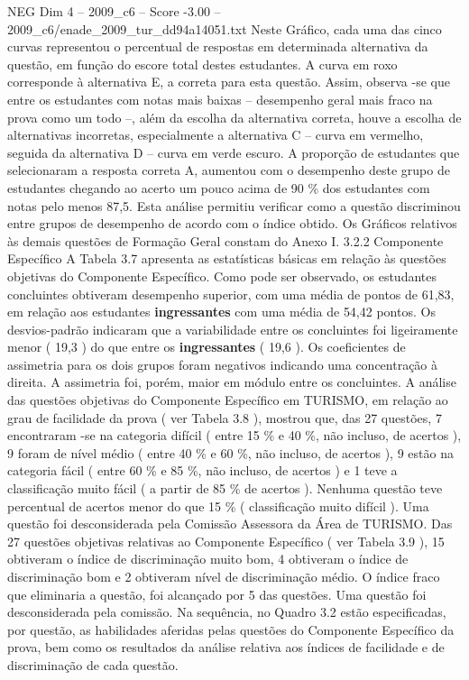 \begin{textsample}{NEG Dim 4 – 2009\_c6 – Score -3.00 – 2009\_c6/enade\_2009\_tur\_dd94a14051.txt}
Neste Gráfico, cada uma das cinco curvas representou o percentual de respostas em determinada alternativa da questão, em função do escore total destes estudantes.
A curva em roxo corresponde à alternativa E, a correta para esta questão.
Assim, observa -se que entre os estudantes com notas mais baixas – desempenho geral mais fraco na prova como um todo –, além da escolha da alternativa correta, houve a escolha de alternativas incorretas, especialmente a alternativa C – curva em vermelho, seguida da alternativa D – curva em verde escuro.
A proporção de estudantes que selecionaram a resposta correta A, aumentou com o desempenho deste grupo de estudantes chegando ao acerto um pouco acima de 90 \% dos estudantes com notas pelo menos 87,5.
Esta análise permitiu verificar como a questão discriminou entre grupos de desempenho de acordo com o índice obtido.
Os Gráficos relativos às demais questões de Formação Geral constam do Anexo I. 3.2.2 Componente Específico A Tabela 3.7 apresenta as estatísticas básicas em relação às questões objetivas do Componente Específico.
Como pode ser observado, os estudantes concluintes obtiveram desempenho superior, com uma média de pontos de 61,83, em relação aos estudantes \textbf{ingressantes} com uma média de 54,42 pontos.
Os desvios-padrão indicaram que a variabilidade entre os concluintes foi ligeiramente menor ( 19,3 ) do que entre os \textbf{ingressantes} ( 19,6 ).
Os coeficientes de assimetria para os dois grupos foram negativos indicando uma concentração à direita.
A assimetria foi, porém, maior em módulo entre os concluintes.
A análise das questões objetivas do Componente Específico em TURISMO, em relação ao grau de facilidade da prova ( ver Tabela 3.8 ), mostrou que, das 27 questões, 7 encontraram -se na categoria difícil ( entre 15 \% e 40 \%, não incluso, de acertos ), 9 foram de nível médio ( entre 40 \% e 60 \%, não incluso, de acertos ), 9 estão na categoria fácil ( entre 60 \% e 85 \%, não incluso, de acertos ) e 1 teve a classificação muito fácil ( a partir de 85 \% de acertos ).
Nenhuma questão teve percentual de acertos menor do que 15 \% ( classificação muito difícil ).
Uma questão foi desconsiderada pela Comissão Assessora da Área de TURISMO.
Das 27 questões objetivas relativas ao Componente Específico ( ver Tabela 3.9 ), 15 obtiveram o índice de discriminação muito bom, 4 obtiveram o índice de discriminação bom e 2 obtiveram nível de discriminação médio.
O índice fraco que eliminaria a questão, foi alcançado por 5 das questões.
Uma questão foi desconsiderada pela comissão.
Na sequência, no Quadro 3.2 estão especificadas, por questão, as habilidades aferidas pelas questões do Componente Específico da prova, bem como os resultados da análise relativa aos índices de facilidade e de discriminação de cada questão.

\end{textsample}

